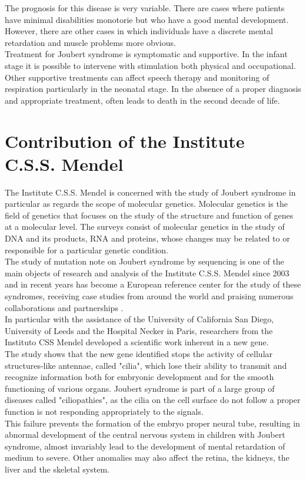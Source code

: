 \documentclass[a4paper]{report}
\begin{document}
The prognosis for this disease is very variable. There are cases where patients have minimal disabilities monotorie but who have a good mental development. However, there are other cases in which individuals have a discrete mental retardation and muscle problems more obvious.\\
Treatment for Joubert syndrome is symptomatic and supportive. In the infant stage it is possible to intervene with stimulation both physical and occupational. Other supportive treatments can affect speech therapy and monitoring of respiration particularly in the neonatal stage. In the absence of a proper diagnosis and appropriate treatment, often leads to death in the second decade of life.

\section{Contribution of the Institute C.S.S. Mendel}
The Institute C.S.S. Mendel is concerned with the study of Joubert syndrome in particular as regards the scope of molecular genetics. Molecular genetics is the field of genetics that focuses on the study of the structure and function of genes at a molecular level. The surveys consist of molecular genetics in the study of DNA and its products, RNA and proteins, whose changes may be related to or responsible for a particular genetic condition. \\
The study of mutation note on Joubert syndrome by sequencing is one of the main objects of research and analysis of the Institute C.S.S. Mendel since 2003 and in recent years has become a European reference center for the study of these syndromes, receiving case studies from around the world and praising numerous collaborations and partnerships \cite{2}.\\
In particular with the assistance of the University of California San Diego, University of Leeds and the Hospital Necker in Paris, researchers from the Instituto CSS Mendel developed a scientific work inherent in a new gene. \\
The study shows that the new gene identified stops the activity of cellular structures-like antennae, called "cilia", which lose their ability to transmit and recognize information both for embryonic development and for the smooth functioning of various organs. 
Joubert syndrome is part of a large group of diseases called "ciliopathies", as the cilia on the cell surface do not follow a proper function is not responding appropriately to the signals. \\
This failure prevents the formation of the embryo proper neural tube, resulting in abnormal development of the central nervous system in children with Joubert syndrome, almost invariably lead to the development of mental retardation of medium to severe. Other anomalies may also affect the retina, the kidneys, the liver and the skeletal system.
\end{document}
